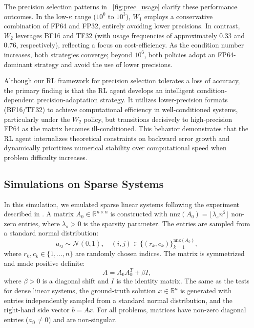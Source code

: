 \documentclass[Afour,sageh,times]{sagej}
\theoremstyle{plain}
\theoremstyle{definition}
\begin{document}
The precision selection patterns in \figurename~\ref{fig:prec_usage} clarify these performance outcomes. In the low-$\kappa$ range ($10^0$ to $10^3$), $W_1$ employs a conservative combination of FP64 and FP32, entirely avoiding lower precisions. In contrast, $W_2$ leverages BF16 and TF32 (with usage frequencies of approximately $0.33$ and $0.76$, respectively), reflecting a focus on cost-efficiency. As the condition number increases, both strategies converge; beyond $10^6$, both policies adopt an FP64-dominant strategy and avoid the use of lower precisions.

Although our RL framework for precision selection tolerates a loss of accuracy, the primary finding is that the RL agent develops an intelligent condition-dependent precision-adaptation strategy. It utilizes lower-precision formats (BF16/TF32) to achieve computational efficiency in well-conditioned systems, particularly under the $W_2$ policy, but transitions decisively to high-precision FP64 as the matrix becomes ill-conditioned. This behavior demonstrates that the RL agent internalizes theoretical constraints on backward error growth and dynamically prioritizes numerical stability over computational speed when problem difficulty increases.


\subsection{Simulations on Sparse Systems}
In this simulation, we emulated sparse linear systems following the experiment described in \cite{hausner2024neural}. A matrix $A_0 \in \mathbb{R}^{n \times n}$ is constructed with $\text{nnz}(A_0) = \lfloor \lambda_s n^2 \rfloor$ non-zero entries, where $\lambda_s > 0$ is the sparsity parameter. The entries are sampled from a standard normal distribution:
\begin{equation*}
a_{ij} \sim \mathcal{N}(0, 1), \quad (i, j) \in \{(r_k, c_k)\}_{k=1}^{\text{nnz}(A_0)},
\end{equation*}
where $r_k, c_k \in \{1, \ldots, n\}$ are randomly chosen indices. The matrix is symmetrized and made positive definite:
\begin{equation*}
A = A_0 A_0^T + \beta I,
\end{equation*}
where $\beta > 0$ is a diagonal shift and $I$ is the identity matrix. The same as the tests for dense linear systems, the ground-truth solution $x \in \mathbb{R}^n$ is generated with entries independently sampled from a standard normal distribution, and the right-hand side vector $b = A x$.   For all problems, matrices have non-zero diagonal entries ($a_{ii} \neq 0$) and are non-singular.
\end{document}
